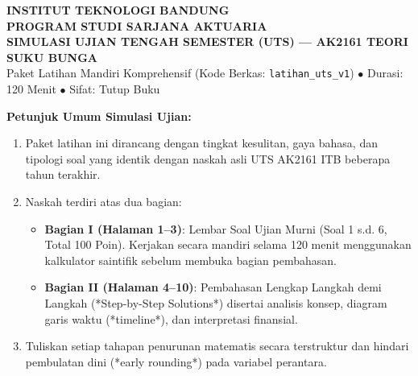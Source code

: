 \documentclass[11pt,a4paper]{article}
\begin{document}
\begin{tcolorbox}[
    enhanced,
    colback=primaryblue,
    colframe=primaryblue,
    arc=2mm,
    left=4mm,right=4mm,top=3.5mm,bottom=3.5mm,
    boxrule=0pt
]
\begin{center}
    {\fontsize{15}{18}\selectfont\bfseries\color{white} INSTITUT TEKNOLOGI BANDUNG}\\[1mm]
    {\fontsize{13}{16}\selectfont\bfseries\color{amberbg} PROGRAM STUDI SARJANA AKTUARIA}\\[1.5mm]
    {\fontsize{12}{15}\selectfont\bfseries\color{white} SIMULASI UJIAN TENGAH SEMESTER (UTS) --- AK2161 TEORI SUKU BUNGA}\\[1mm]
    {\fontsize{9.5}{12}\selectfont\color{white} Paket Latihan Mandiri Komprehensif (Kode Berkas: \texttt{latihan\_uts\_v1}) $\bullet$ Durasi: 120 Menit $\bullet$ Sifat: Tutup Buku}
\end{center}
\end{tcolorbox}

\vspace{1.5mm}

\begin{tcolorbox}[
    enhanced,
    colback=boxbg,
    colframe=secondaryblue,
    arc=1.5mm,
    boxrule=0.6pt,
    left=3mm,right=3mm,top=2mm,bottom=2mm
]
\small
\textbf{Petunjuk Umum Simulasi Ujian:}
\begin{enumerate}[leftmargin=5mm, topsep=1pt, itemsep=1pt]
    \item Paket latihan ini dirancang dengan tingkat kesulitan, gaya bahasa, dan tipologi soal yang identik dengan naskah asli UTS AK2161 ITB beberapa tahun terakhir.
    \item Naskah terdiri atas dua bagian:
    \begin{itemize}[leftmargin=4mm, topsep=1pt, itemsep=1pt]
        \item \textbf{Bagian I (Halaman 1--3)}: Lembar Soal Ujian Murni (Soal 1 s.d. 6, Total 100 Poin). Kerjakan secara mandiri selama 120 menit menggunakan kalkulator saintifik sebelum membuka bagian pembahasan.
        \item \textbf{Bagian II (Halaman 4--10)}: Pembahasan Lengkap Langkah demi Langkah (*Step-by-Step Solutions*) disertai analisis konsep, diagram garis waktu (*timeline*), dan interpretasi finansial.
    \end{itemize}
    \item Tuliskan setiap tahapan penurunan matematis secara terstruktur dan hindari pembulatan dini (*early rounding*) pada variabel perantara.
\end{enumerate}
\end{tcolorbox}
\end{document}
